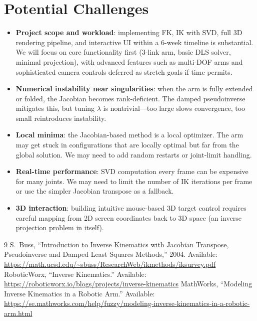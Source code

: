 \documentclass[11pt]{article}
\begin{document}
\section{Potential Challenges}

\begin{itemize}[nosep]
    \item \textbf{Project scope and workload}: implementing FK, IK with SVD, full 3D rendering pipeline, and interactive UI within a 6-week timeline is substantial. We will focus on core functionality first (3-link arm, basic DLS solver, minimal projection), with advanced features such as multi-DOF arms and sophisticated camera controls deferred as stretch goals if time permits.
    \item \textbf{Numerical instability near singularities}: when the arm is fully extended or folded, the Jacobian becomes rank-deficient. The damped pseudoinverse mitigates this, but tuning $\lambda$ is nontrivial---too large slows convergence, too small reintroduces instability.
    \item \textbf{Local minima}: the Jacobian-based method is a local optimizer. The arm may get stuck in configurations that are locally optimal but far from the global solution. We may need to add random restarts or joint-limit handling.
    \item \textbf{Real-time performance}: SVD computation every frame can be expensive for many joints. We may need to limit the number of IK iterations per frame or use the simpler Jacobian transpose as a fallback.
    \item \textbf{3D interaction}: building intuitive mouse-based 3D target control requires careful mapping from 2D screen coordinates back to 3D space (an inverse projection problem in itself).
\end{itemize}

\begin{thebibliography}{9}
 S.~Buss, ``Introduction to Inverse Kinematics with Jacobian Transpose, Pseudoinverse and Damped Least Squares Methods,'' 2004. Available: \url{https://math.ucsd.edu/~sbuss/ResearchWeb/ikmethods/iksurvey.pdf}
 RoboticWorx, ``Inverse Kinematics.'' Available: \url{https://roboticworx.io/blogs/projects/inverse-kinematics}
 MathWorks, ``Modeling Inverse Kinematics in a Robotic Arm.'' Available: \url{https://se.mathworks.com/help/fuzzy/modeling-inverse-kinematics-in-a-robotic-arm.html}
\end{thebibliography}
\end{document}
